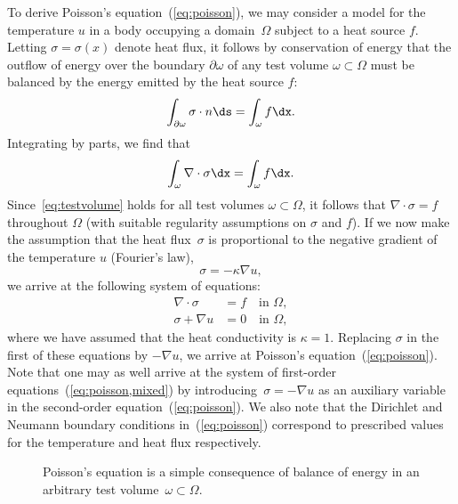 To derive Poisson's equation~(\ref{eq:poisson}), we may consider a
model for the temperature $u$ in a body occupying a domain~$\Omega$
subject to a heat source $f$. Letting $\sigma = \sigma(x)$ denote heat
flux, it follows by conservation of energy that the outflow of energy
over the boundary $\partial\omega$ of any test volume
$\omega\subset\Omega$ must be balanced by the energy emitted by the
heat source $f$:
\begin{equation}
  \int_{\partial\omega} \sigma \cdot n \ds = \int_{\omega} f \dx.
\end{equation}
Integrating by parts, we find that
\begin{equation} \label{eq:testvolume}
  \int_{\omega} \nabla \cdot \sigma \dx = \int_{\omega} f \dx.
\end{equation}
Since~\eqref{eq:testvolume} holds for all test volumes
$\omega \subset \Omega$, it follows that $\nabla \cdot \sigma = f$
throughout $\Omega$ (with suitable regularity assumptions on $\sigma$
and $f$). If we now make the assumption that the heat flux~$\sigma$ is
proportional to the negative gradient of the temperature $u$
(Fourier's law), 
\begin{equation}
  \sigma = -\kappa \nabla u,
\end{equation}
we arrive at
the following system of equations:
\begin{equation} \label{eq:poisson,mixed}
  \begin{split}
    \nabla \cdot \sigma &= f \quad \mbox{in } \Omega, \\
    \sigma + \nabla u   &= 0   \quad \mbox{in } \Omega,
  \end{split}
\end{equation}
where we have assumed that the heat conductivity is $\kappa = 1$.
Replacing $\sigma$ in the first of these equations by $-\nabla u$, we
arrive at Poisson's equation~(\ref{eq:poisson}). Note that one may as
well arrive at the system of first-order
equations~(\ref{eq:poisson,mixed}) by introducing~$\sigma = -\nabla u$
as an auxiliary variable in the second-order
equation~(\ref{eq:poisson}). We also note that the Dirichlet and
Neumann boundary conditions in~(\ref{eq:poisson}) correspond to
prescribed values for the temperature and heat flux respectively.

\begin{figure}
  \center{}
  \caption{Poisson's equation is a simple consequence of balance of
    energy in an arbitrary test volume~$\omega \subset \Omega$.}
\end{figure}

